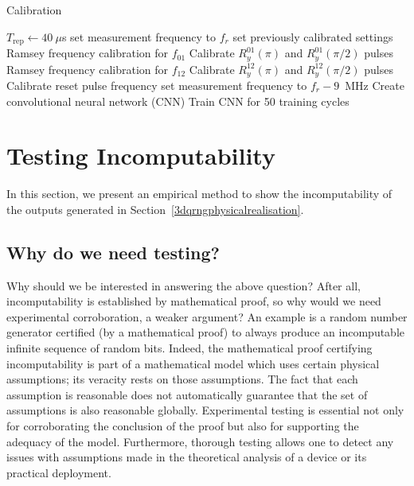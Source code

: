 \documentclass[l1pt]{elsarticle}
\begin{document}
{\begin{algorithm}
\caption{Calibration}\label{alg:calibration}
\begin{algorithmic}[1]
\State $T_{\text{rep}} \gets 40~\mu$s
\State set measurement frequency to $f_r$
\State set previously calibrated settings
\State Ramsey frequency calibration for $f_{01}$
\State Calibrate $R^{01}_y(\pi)$ and $R^{01}_y(\pi/2)$ pulses
\State Ramsey frequency calibration for $f_{12}$
\State Calibrate $R^{12}_y(\pi)$ and $R^{12}_y(\pi/2)$ pulses
\State Calibrate reset pulse frequency
\State set measurement frequency to $f_r - 9$~MHz
\State Create convolutional neural network (CNN)
\State Train CNN for 50 training cycles
\EndProcedure
\end{algorithmic}
\end{algorithm}



}

\newpage
\section{Testing Incomputability}
\label{testing}

In this section, we present an empirical method to show the incomputability of the outputs generated in Section~\ref{3dqrngphysicalrealisation}.


\subsection{Why do we need testing?}
Why should we be interested in answering the above question? After all, incomputability is established
by mathematical proof, so why would we need experimental corroboration, a weaker argument? An example is a random number generator certified (by a mathematical proof) to always produce an incomputable infinite sequence of random bits. Indeed, the mathematical proof certifying incomputability is part of a mathematical model which uses certain physical assumptions; its veracity rests on those assumptions. The fact that each assumption is reasonable does not automatically guarantee that the set of assumptions is also reasonable globally. Experimental testing is essential not only for corroborating the conclusion of the proof but also for supporting the adequacy of the model.
Furthermore, thorough testing allows one to detect any issues with assumptions made in the
theoretical analysis of a device or its practical deployment.
\end{document}
